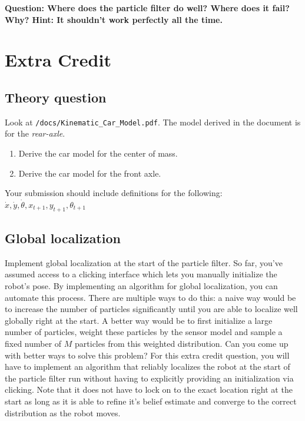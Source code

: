 \documentclass[final]{article}
\newcommand{\code}[1]{\texttt{#1}}
\begin{document}
\textbf{Question: Where does the particle filter do well? Where does it fail? Why?
Hint: It shouldn't work perfectly all the time.}

\section{Extra Credit}

\subsection{Theory question}
Look at \code{/docs/Kinematic\_Car\_Model.pdf}. The model derived in the document is for the \emph{rear-axle}. 

\begin{enumerate}
	\item Derive the car model for the center of mass. 
	\item Derive the car model for the front axle.
\end{enumerate}

Your submission should include definitions for the following: \(\dot{x},\dot{y},\dot{\theta},x_{t+1}, y_{t+1},\theta_{t+1}\)

\subsection{Global localization}

Implement global localization at the start of the particle filter. So far, you’ve assumed access to a clicking interface which lets you manually initialize the robot’s pose. By implementing an algorithm for global localization, you can automate this process. There are multiple ways to do this: a naive way would be to increase the number of particles significantly until you are able to localize well globally right at the start. A better way would be to first initialize a large number of particles, weight these particles by the sensor model and sample a fixed number of $M$ particles from this weighted distribution. Can you come up with better ways to solve this problem? For this extra credit question, you will have to implement an algorithm that reliably localizes the robot at the start of the particle filter run without having to explicitly providing an initialization via clicking. Note that it does not have to lock on to the exact location right at the start as long as it is able to refine it’s belief estimate and converge to the correct distribution as the robot moves. 
\end{document}
